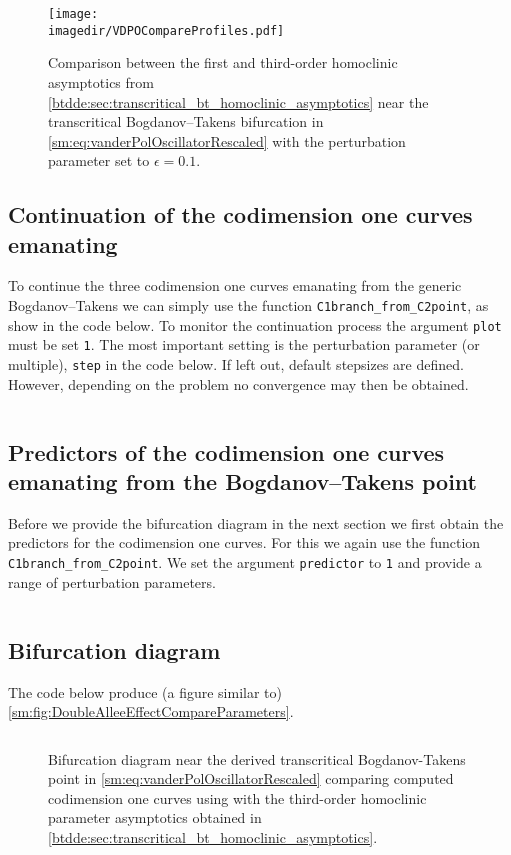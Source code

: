 \begin{figure}[ht]
    \centering
    \texttt{[image: \\imagedir/VDPOCompareProfiles.pdf]}
    \caption{Comparison between the first and third-order homoclinic asymptotics from
    \cref{btdde:sec:transcritical_bt_homoclinic_asymptotics} near the transcritical
        Bogdanov--Takens bifurcation in \cref{sm:eq:vanderPolOscillatorRescaled} with the
        perturbation parameter set to $\epsilon=0.1$.}
    \label{sm:fig:VDPOCompareProfiles}
\end{figure}

\subsection{Continuation of the codimension one curves emanating}
To continue the three codimension one curves emanating from the generic
Bogdanov--Takens we can simply use the function
\texttt{C1branch_from_C2point}, as show in the code below. To monitor the
continuation process the argument \texttt{plot} must be set \texttt{1}.
The most important setting is the perturbation parameter (or multiple),
\texttt{step} in the code below. If left out, default stepsizes are defined.
However, depending on the problem no convergence may then be obtained.
\inputminted[firstline=89, lastline=113]{MATLAB}{\pathToDDEBifToolDemos/vdpo_bt_transcritical/vanderPolOscillator.m}

\subsection{Predictors of the codimension one curves emanating from the Bogdanov--Takens point}
Before we provide the bifurcation diagram in the next section we first obtain the predictors
for the codimension one curves. For this we again use the function
\texttt{C1branch_from_C2point}. We set the argument \texttt{predictor} to \texttt{1}
and provide a range of perturbation parameters.
\inputminted[firstline=135, lastline=154]{MATLAB}{\pathToDDEBifToolDemos/vdpo_bt_transcritical/vanderPolOscillator.m}

\subsection{Bifurcation diagram}
The code below produce (a figure similar to) \cref{sm:fig:DoubleAlleeEffectCompareParameters}.
\inputminted[firstline=156, lastline=182]{MATLAB}{\pathToDDEBifToolDemos/vdpo_bt_transcritical/vanderPolOscillator.m}
%
\begin{figure}[ht]
    \centering
    \caption{Bifurcation diagram near the derived transcritical Bogdanov-Takens point in
        \cref{sm:eq:vanderPolOscillatorRescaled} comparing computed codimension one curves using
        \DDEBIFTOOL with the third-order homoclinic parameter asymptotics obtained
        in \cref{btdde:sec:transcritical_bt_homoclinic_asymptotics}.}
    \label{sm:fig:VDPOCompareParameters}
\end{figure}

